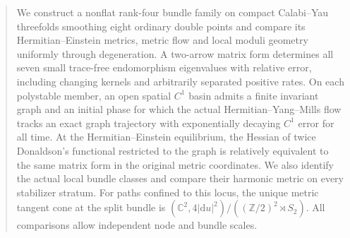 

\begin{abstract}
We construct a nonflat rank-four bundle family on compact Calabi--Yau
threefolds smoothing eight ordinary double points and compare its
Hermitian--Einstein metrics, metric flow and local moduli geometry
uniformly through degeneration. A two-arrow matrix form determines all
seven small trace-free endomorphism eigenvalues with relative error,
including changing kernels and arbitrarily separated positive rates.
On each polystable member, an open spatial $C^1$ basin admits a finite
invariant graph and an initial phase for which the actual
Hermitian--Yang--Mills flow tracks an exact graph trajectory with
exponentially decaying $C^1$ error for all time. At the Hermitian--Einstein
equilibrium, the Hessian of twice Donaldson's functional restricted to
the graph is relatively equivalent to the same matrix form in the
original metric coordinates. We also identify the actual local bundle classes and
compare their harmonic metric on every stabilizer stratum. For paths
confined to this locus, the unique metric tangent cone at the split
bundle is $(\mathbb C^2,4|\mathrm du|^2)/((\mathbb Z/2)^2\rtimes S_2)$.
All comparisons allow independent node and bundle scales.
\end{abstract}
\maketitle















